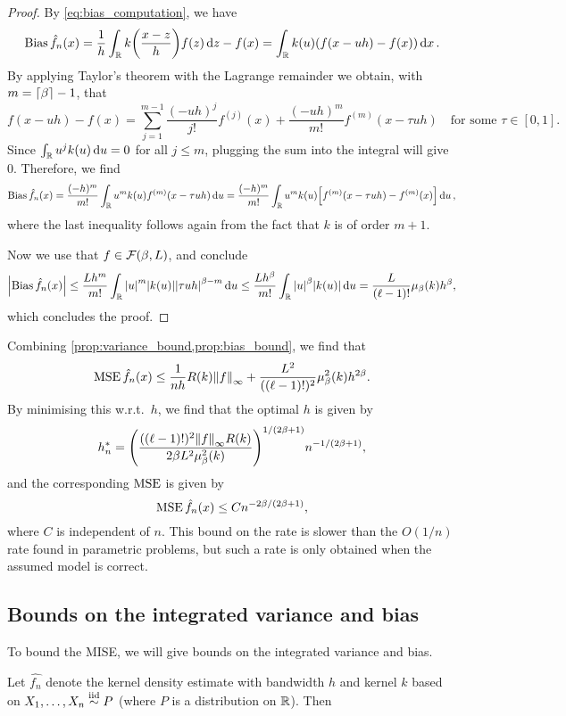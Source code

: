 \begin{proof}
	By \cref{eq:bias_computation}, we have 
	\[
	\operatorname{Bias} \hat f_n(x) = \frac1h \int_\mathbb R k\qty(\frac{x - z}{h}) f(z) \dd{z} - f(x) = \int_\mathbb R k(u)\qty( f(x - uh) - f(x)) \dd{x}. 
	\]
	By applying Taylor's theorem with the Lagrange remainder we obtain, with $m = \lceil\beta\rceil - 1$, that
	\[
	f(x - uh) - f(x) = \sum_{j=1}^{m-1} \frac{(-uh)^j}{j!} f^{(j)}(x) + \frac{(-uh)^m}{m!} f^{(m)}(x - \tau u h) \quad\text{for some $\tau \in [0, 1]$}. 
	\]
	Since $\int_\mathbb R u^j k(u) \dd{u} = 0$ for all $j \leq m$, plugging the sum into the integral will give 0. Therefore, we find
	\[
	\operatorname{Bias} \hat f_n(x) =  \frac{(-h)^m}{m!} \int_\mathbb R u^m k(u) f^{(m)}(x - \tau uh) \dd{u} = \frac{(-h)^m}{m!} \int_\mathbb R u^m k(u) \qty[f^{(m)}(x - \tau uh)
- f^{(m)}(x)] \dd{u},	\]
	where the last inequality follows again from the fact that $k$ is of order $m + 1$. 
	
	Now we use that $f \in \mathcal F(\beta, L)$, and conclude
	\[
	\abs{\operatorname{Bias} \hat f_n(x)} \leq \frac{Lh^m}{m!} \int_\mathbb R \abs{u}^m \abs{k(u)} \abs{\tau u h}^{\beta - m} \dd{u} \leq \frac{Lh^\beta}{m!} \int_\mathbb R \abs{u}^\beta \abs{k(u)} \dd{u} = \frac{L}{(\ell - 1)!} \mu_\beta(k) h^\beta,
	\]	
	which concludes the proof. 
\end{proof}

Combining \cref{prop:variance_bound,prop:bias_bound}, we find that
\[
\operatorname{MSE} \hat f_n(x) \leq \frac{1}{nh} R(k) \norm{f}_\infty + \frac{L^2}{((\ell - 1)!)^2} \mu^2_\beta(k) h^{2\beta}. 
\]
By minimising this w.r.t.\ $h$, we find that the optimal $h$ is given by
\[
h_n^* = \qty(\frac{((\ell - 1)!)^2 \norm{f}_\infty R(k)}{2\beta L^2 \mu_\beta^2(k)})^{1/(2\beta + 1)} n^{-1/(2\beta + 1)}, 
\]
and the corresponding $\operatorname{MSE}$ is given by
\[
\operatorname{MSE} \hat f_n(x) \leq C n^{-2\beta/(2\beta + 1)},
\]
where $C$ is independent of $n$. This bound on the rate is slower than the $O(1/n)$ rate found in parametric problems, but such a rate is only obtained when the assumed model is correct. 

\subsection{Bounds on the integrated variance and bias}
To bound the MISE, we will give bounds on the integrated variance and bias. 
\begin{proposition}
	Let $\hat{f_n}$ denote the kernel density estimate with bandwidth $h$ and kernel $k$ based on $X_1, \dotsc, X_n \overset{\mathrm{iid}}{\sim} P$ (where $P$ is a distribution on $\mathbb R$). Then 
\end{proposition} 